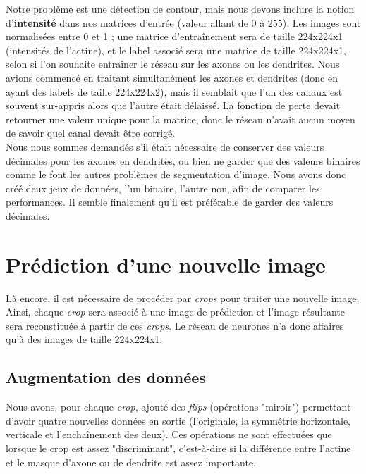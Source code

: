 \documentclass{report}
\begin{document}
Notre problème est une détection de contour, mais nous devons inclure la notion
d'\textbf{intensité} dans nos matrices d'entrée (valeur allant de 0 à 255).
Les images sont normalisées entre 0 et 1 ; une matrice d'entraînement sera de
taille 224x224x1 (intensités de l'actine), et le label associé sera une matrice
de taille 224x224x1, selon si l'on souhaite entraîner le réseau sur les axones
ou les dendrites. Nous avions commencé en traitant simultanément les axones et
dendrites (donc en ayant des labels de taille 224x224x2), mais il semblait
que l'un des canaux est souvent sur-appris alors que l'autre était délaissé.
La fonction de perte devait retourner une valeur unique pour la matrice, donc
le réseau n'avait aucun moyen de savoir quel canal devait être corrigé. \\
Nous nous sommes demandés s'il était nécessaire de conserver des valeurs décimales
pour les axones en dendrites, ou bien ne garder que des valeurs binaires comme le
font les autres problèmes de segmentation d'image. Nous avons donc créé deux jeux
de données, l'un binaire, l'autre non, afin de comparer les performances. Il semble
finalement qu'il est préférable de garder des valeurs décimales.

\section{Prédiction d'une nouvelle image}

Là encore, il est nécessaire de procéder par \textit{crops} pour traiter une nouvelle
image. Ainsi, chaque \textit{crop} sera associé à une image de prédiction
et l'image résultante sera reconstituée à partir de ces \textit{crops}. Le réseau
de neurones n'a donc affaires qu'à des images de taille 224x224x1.

\subsection{Augmentation des données}

Nous avons, pour chaque \textit{crop}, ajouté des \textit{flips} (opérations "miroir")
permettant d'avoir quatre nouvelles données en sortie (l'originale, la symmétrie horizontale,
verticale et l'enchaînement des deux). Ces opérations ne sont effectuées que lorsque
le crop est assez "discriminant", c'est-à-dire si la différence entre l'actine
et le masque d'axone ou de dendrite est assez importante.


\end{document}
